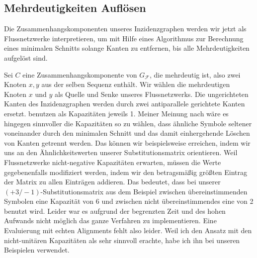 \begin{center}
\end{center}

\subsection{Mehrdeutigkeiten Auflösen}

Die Zusammenhangskomponenten unseres Inzidenzgraphen werden wir jetzt als Flussnetzwerke interpretieren, um mit Hilfe eines Algorithmus zur Berechnung eines minimalen Schnitts solange Kanten zu entfernen, bis alle Mehrdeutigkeiten aufgelöst sind.

Sei $C$ eine Zusammenhangskomponente von $G_{\mathcal{F}}$, die mehrdeutig ist, also zwei Knoten $x,y$ aus der selben Sequenz enthält. Wir wählen die mehrdeutigen Knoten $x$ und $y$ als Quelle und Senke unseres Flussnetzwerks. Die ungerichteten Kanten des Inzidenzgraphen werden durch zwei antiparallele gerichtete Kanten ersetzt. \cite{cpm10} benutzen als Kapazitäten jeweils 1. Meiner Meinung nach wäre es hingegen sinnvoller die Kapazitäten so zu wählen, dass ähnliche Symbole seltener voneinander durch den minimalen Schnitt und das damit einhergehende Löschen von Kanten getrennt werden. Das können wir beispielsweise erreichen, indem wir uns an den Ähnlichkeitswerten unserer Substitutionsmatrix orientieren. Weil Flussnetzwerke nicht-negative Kapazitäten erwarten, müssen die Werte gegebenenfalls modifiziert werden, indem wir den betragsmäßig größten Eintrag der Matrix zu allen Einträgen addieren. Das bedeutet, dass bei unserer $(+3/-1)$-Substitutionsmatrix aus dem Beispiel zwischen übereinstimmenden Symbolen eine Kapazität von 6 und zwischen nicht übereinstimmendes eine von 2 benutzt wird. Leider war es aufgrund der begrenzten Zeit und des hohen Aufwands nicht möglich das ganze Verfahren zu implementieren. Eine Evaluierung mit echten Alignments fehlt also leider. Weil ich den Ansatz mit den nicht-unitären Kapazitäten als sehr sinnvoll erachte, habe ich ihn bei unseren Beispielen verwendet.

